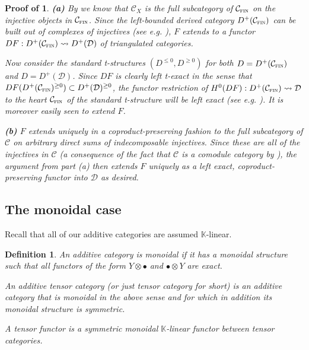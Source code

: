 \documentclass[11pt]{article}
\theoremstyle{plain}
\theoremstyle{nonumberplain}
\theoremstyle{plain}
\newtheorem{definition}[lemma]{Definition}
\theoremstyle{nonumberplain}
\newtheorem{proof_of_univ}{Proof of \Cref{th.univ}}
\newcommand\bK{{\mathbb K}}
\newcommand\cC{{\mathcal C}}
\newcommand\cD{{\mathcal D}}
\DeclareMathOperator{\fin}{\cat{fin}}
\newcommand{\define}[1]{{\em #1}}
\newcommand{\cat}[1]{\textsc{#1}}
\begin{document}
\begin{proof_of_univ}
{\bf (a)} %
By  we know that $\cC_X$ is the full subcategory of $\cC_{\fin}$ on the injective objects in $\cC_{\fin}$. Since the left-bounded derived category $D^+(\cC_{\fin})$ can be built out of complexes of injectives (see e.g. \cite[Chapter III, $\S$2]{my}), $F$ extends to a functor $DF:D^+(\cC_{\fin})\rightsquigarrow D^+(\cD)$ of triangulated categories. 

Now consider the standard t-structures $(D^{\le 0},D^{\ge 0})$ for both $D=D^+(\cC_{\fin})$ and $D=D^+(\cD)$. Since $DF$ is clearly left t-exact in the sense that $DF(D^+(\cC_{\fin})^{\ge 0})\subset D^+(\cD)^{\ge 0}$, the functor restriction of $H^0(DF):D^+(\cC_{\fin})\rightsquigarrow \cD$ to the heart $\cC_{\fin}$ of the standard t-structure will be left exact (see e.g. \cite[Proposition 8.1.15]{HTT08}). It is moreover easily seen to extend $F$. 

{\bf (b)} $F$ extends uniquely in a coproduct-preserving fashion to the full subcategory of $\cC$ on \define{arbitrary} direct sums of indecomposable injectives. Since these are all of the injectives in $\cC$ (a consequence of the fact that $\cC$ is a comodule category by ), the argument from part (a) then extends $F$ uniquely as a left exact, coproduct-preserving functor into $\cD$ as desired. 
\end{proof_of_univ}




\subsection{The monoidal case}
\label{subse.tensor}


Recall that all of our additive categories are assumed $\bK$-linear. 


\begin{definition}\label{def.tensor_Groth}
  An additive category is \define{monoidal} if it has a monoidal structure such that all functors of the form $Y\otimes\bullet$ and $\bullet\otimes Y$ are exact. 
 
An \define{additive tensor category} (or just tensor category for short) is an additive category that is monoidal in the above sense and for which in addition its monoidal structure is symmetric. 

A \define{tensor functor} is a symmetric monoidal $\bK$-linear functor between tensor categories. 
\end{definition}
\end{document}
